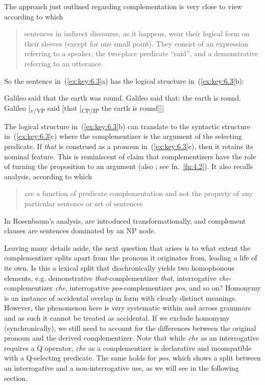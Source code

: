 \documentclass[output=paper]{langsci/langscibook}
\begin{document}
The approach just outlined regarding complementation is very close to
 view according to which \blockquote{sentences
    in indirect discourse, as it happens, wear their logical form on their
    sleeves (except for one small point). They consist of an expression
referring to a speaker, the two-place predicate \enquote{said}, and a
demonstrative referring to an utterance.} So the sentence in~(\ref{ex:key:6.3}a) has the
logical structure in~(\ref{ex:key:6.3}b):\largerpage

\ea\label{ex:key:6.3}
	\ea Galileo said that the earth was round.
	\ex Galileo said that: the earth is round.
	\ex Galileo [\textsubscript{v/VP} said [that [\textsubscript{CP/}\textsubscript{IP} the earth is round]]]
	\z
\z

The logical structure in~(\ref{ex:key:6.3}b) can translate to the syntactic structure in~(\ref{ex:key:6.3}c)
where the complementizer is the argument of the selecting predicate. If
\emph{that} is construed as a pronoun in~(\ref{ex:key:6.3}c), then it retains its nominal
feature. This is reminiscent of  claim that complementizers
have the role of turning the proposition to an argument (also
\citealt{Kayne2005b}; see fn.~\ref{fn:4.2}). It also recalls 
analysis, according to which  \blockquote{are a function of
    predicate complementation and not the property of any particular sentence
or set of sentences}.  In Rosenbaum’s analysis,  are introduced
transformationally, and complement clauses are sentences dominated by an NP
node.

Leaving many details aside, the next question that arises is to what extent the
complementizer splits apart from the pronoun it originates from, leading a life
of its own. Is this a lexical split that diachronically yields two homophonous
elements, e.g. demonstrative \emph{that}-com\-ple\-men\-tiz\-er \emph{that},
interrogative \emph{che}-com\-ple\-men\-tiz\-er \emph{che}, interrogative
\emph{pos}-complementizer \emph{pos}, and so on? Homonymy is an instance of
accidental overlap in form with clearly distinct meanings. However, the
phenomenon here is very systematic within and across grammars and as such it
cannot be treated as accidental. If we exclude homonymy (synchronically), we
still need to account for the differences between the original pronoun and the
derived complementizer. Note that while \emph{che} as an interrogative
requires a Q operator, \emph{che} as a complementizer is declarative and
incompatible with a Q-selecting predicate. The same holds for 
\emph{pos}, which shows a split between an interrogative and a
non-interrogative use, as we will see in the following section.
\end{document}
